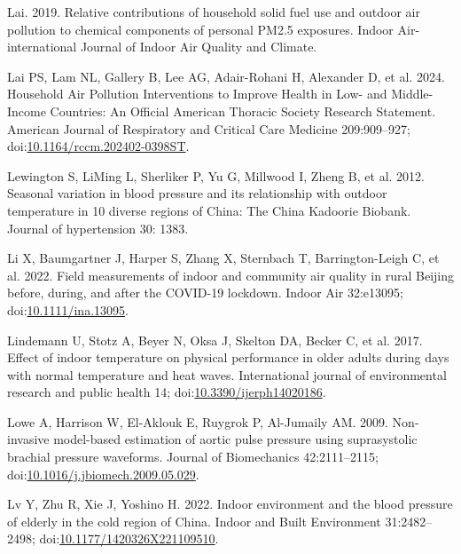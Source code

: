 \documentclass[
  letterpaper,
  DIV=11,
  numbers=noendperiod]{scrartcl}
\newlength{\cslhangindent}
\newenvironment{CSLReferences}[2] %
 {\begin{list}{}{%
  \setlength{\itemindent}{0pt}
  \setlength{\leftmargin}{0pt}
  \setlength{\parsep}{0pt}
  \ifodd #1
   \setlength{\leftmargin}{\cslhangindent}
   \setlength{\itemindent}{-1\cslhangindent}
  \fi
  \setlength{\itemsep}{#2\baselineskip}}}
 {\end{list}}
\begin{document}
\begin{CSLReferences}{1}{1}
Lai. 2019. Relative contributions of household solid fuel use and
outdoor air pollution to chemical components of personal {PM2}.5
exposures. Indoor Air-international Journal of Indoor Air Quality and
Climate.

Lai PS, Lam NL, Gallery B, Lee AG, Adair-Rohani H, Alexander D, et al.
2024. Household {Air Pollution Interventions} to {Improve Health} in
{Low-} and {Middle-Income Countries}: {An Official American Thoracic
Society Research Statement}. American Journal of Respiratory and
Critical Care Medicine 209:909--927;
doi:\href{https://doi.org/10.1164/rccm.202402-0398ST}{10.1164/rccm.202402-0398ST}.

Lewington S, LiMing L, Sherliker P, Yu G, Millwood I, Zheng B, et al.
2012. Seasonal variation in blood pressure and its relationship with
outdoor temperature in 10 diverse regions of {China}: The {China
Kadoorie Biobank}. Journal of hypertension 30: 1383.

Li X, Baumgartner J, Harper S, Zhang X, Sternbach T, Barrington-Leigh C,
et al. 2022. Field measurements of indoor and community air quality in
rural {Beijing} before, during, and after the {COVID-19} lockdown.
Indoor Air 32:e13095;
doi:\href{https://doi.org/10.1111/ina.13095}{10.1111/ina.13095}.

Lindemann U, Stotz A, Beyer N, Oksa J, Skelton DA, Becker C, et al.
2017. Effect of indoor temperature on physical performance in older
adults during days with normal temperature and heat waves. International
journal of environmental research and public health 14;
doi:\href{https://doi.org/10.3390/ijerph14020186}{10.3390/ijerph14020186}.

Lowe A, Harrison W, El-Aklouk E, Ruygrok P, Al-Jumaily AM. 2009.
Non-invasive model-based estimation of aortic pulse pressure using
suprasystolic brachial pressure waveforms. Journal of Biomechanics
42:2111--2115;
doi:\href{https://doi.org/10.1016/j.jbiomech.2009.05.029}{10.1016/j.jbiomech.2009.05.029}.

Lv Y, Zhu R, Xie J, Yoshino H. 2022. Indoor environment and the blood
pressure of elderly in the cold region of {China}. Indoor and Built
Environment 31:2482--2498;
doi:\href{https://doi.org/10.1177/1420326X221109510}{10.1177/1420326X221109510}.


\end{CSLReferences}
\end{document}
